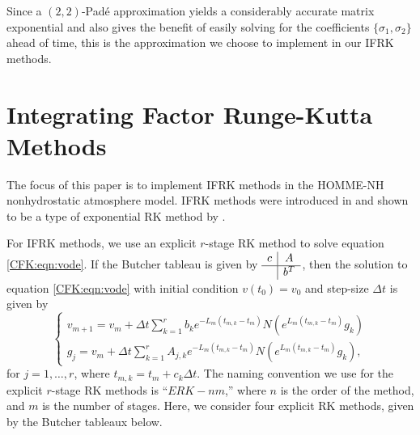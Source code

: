 \documentclass{csri19}
\begin{document}
Since a $(2,2)$-Pad\'e approximation yields a considerably accurate matrix 
exponential and also gives the benefit of easily solving for the 
coefficients $\{\sigma_1, \sigma_2\}$ ahead of time, this is the 
approximation we choose to implement in our IFRK methods.

\section{Integrating Factor Runge-Kutta Methods}\label{CFK:sec:ifrk}
The focus of this paper is to implement IFRK methods in the HOMME-NH 
nonhydrostatic atmosphere model. IFRK methods were introduced in 
\cite{CFK:Lawson1969} and shown to be a type of exponential RK method by
\cite{CFK:Minchev2006}.

For IFRK methods, we use an explicit $r$-stage RK method to solve 
equation \ref{CFK:eqn:vode}. If the Butcher tableau is given by 
$\begin{array}{c|c}
c & A \\ \hline & b^T \end{array}$, then the solution to equation \ref{CFK:eqn:vode} 
with initial condition $v(t_0) = v_0$ and step-size $\Delta t$ is given by
\[ \left\{\begin{array}{l} v_{m+1} = v_m + \Delta t\sum_{k=1}^r b_k 
                         e^{-L_m(t_{m,k}-t_m)}N(e^{L_m(t_{m,k}-t_m)}g_k) \\
          g_j = v_m + \Delta t \sum_{k=1}^r A_{j,k} e^{-L_m(t_{m,k} - t_m)} 
                      N(e^{L_m(t_{m,k}-t_m)}g_k), \end{array} \right. \]
for $j = 1,\dots,r$, where $t_{m,k} = t_m + c_k \Delta t$.
The naming convention we use for the explicit $r$-stage RK methods is ``$ERK
-nm$,'' where $n$ is the order of the method, and $m$ is the number of
stages. Here, we consider four explicit RK methods, given by the Butcher 
tableaux below.
\end{document}
